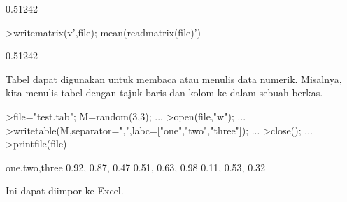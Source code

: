 \documentclass[a4paper,10pt]{article}
\begin{document}
\begin{eulernotebook}
\begin{eulercomment}
\begin{eulercomment}
\begin{eulercomment}
\begin{eulercomment}
\begin{eulercomment}
\begin{eulercomment}
\begin{eulercomment}
\begin{eulercomment}
\begin{eulercomment}
\begin{eulercomment}
\begin{eulercomment}
\begin{eulercomment}
\begin{eulercomment}
\begin{eulercomment}
\begin{eulercomment}
\begin{eulercomment}
\begin{eulercomment}
\begin{eulercomment}
\begin{eulercomment}
\begin{eulercomment}
\begin{eulercomment}
\begin{eulercomment}
\begin{eulercomment}
\begin{eulercomment}
\begin{eulercomment}
\begin{eulercomment}
\begin{eulercomment}
\begin{eulercomment}
\begin{eulercomment}
\begin{eulercomment}
\begin{eulercomment}
\begin{eulercomment}
\begin{eulercomment}
\begin{eulercomment}
\begin{eulercomment}
\begin{eulercomment}
\begin{euleroutput}
  0.51242
\end{euleroutput}
\begin{eulerprompt}
>writematrix(v',file); mean(readmatrix(file)')
\end{eulerprompt}
\begin{euleroutput}
  0.51242
\end{euleroutput}
\begin{eulercomment}
Tabel dapat digunakan untuk membaca atau menulis data numerik.
Misalnya, kita menulis tabel dengan tajuk baris dan kolom ke dalam
sebuah berkas.
\end{eulercomment}
\begin{eulerprompt}
>file="test.tab"; M=random(3,3);  ...
>open(file,"w");  ...
>writetable(M,separator=",",labc=["one","two","three"]);  ...
>close(); ...
>printfile(file)
\end{eulerprompt}
\begin{euleroutput}
  one,two,three
        0.92,      0.87,      0.47
        0.51,      0.63,      0.98
        0.11,      0.53,      0.32
\end{euleroutput}
\begin{eulercomment}
Ini dapat diimpor ke Excel.


\end{eulercomment}
\end{eulercomment}
\end{eulercomment}
\end{eulercomment}
\end{eulercomment}
\end{eulercomment}
\end{eulercomment}
\end{eulercomment}
\end{eulercomment}
\end{eulercomment}
\end{eulercomment}
\end{eulercomment}
\end{eulercomment}
\end{eulercomment}
\end{eulercomment}
\end{eulercomment}
\end{eulercomment}
\end{eulercomment}
\end{eulercomment}
\end{eulercomment}
\end{eulercomment}
\end{eulercomment}
\end{eulercomment}
\end{eulercomment}
\end{eulercomment}
\end{eulercomment}
\end{eulercomment}
\end{eulercomment}
\end{eulercomment}
\end{eulercomment}
\end{eulercomment}
\end{eulercomment}
\end{eulercomment}
\end{eulercomment}
\end{eulercomment}
\end{eulercomment}
\end{eulercomment}
\end{eulernotebook}
\end{document}

